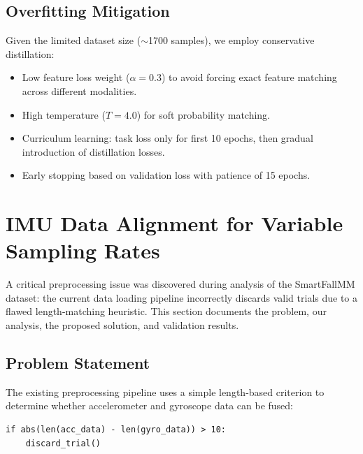 \subsection{Overfitting Mitigation}

Given the limited dataset size ($\sim$1700 samples), we employ conservative distillation:
\begin{itemize}
    \item Low feature loss weight ($\alpha = 0.3$) to avoid forcing exact feature matching across different modalities.
    \item High temperature ($T = 4.0$) for soft probability matching.
    \item Curriculum learning: task loss only for first 10 epochs, then gradual introduction of distillation losses.
    \item Early stopping based on validation loss with patience of 15 epochs.
\end{itemize}


\section{IMU Data Alignment for Variable Sampling Rates}

A critical preprocessing issue was discovered during analysis of the SmartFallMM dataset: the current data loading pipeline incorrectly discards valid trials due to a flawed length-matching heuristic. This section documents the problem, our analysis, the proposed solution, and validation results.

\subsection{Problem Statement}

The existing preprocessing pipeline uses a simple length-based criterion to determine whether accelerometer and gyroscope data can be fused:

\begin{verbatim}
if abs(len(acc_data) - len(gyro_data)) > 10:
    discard_trial()
\end{verbatim}

